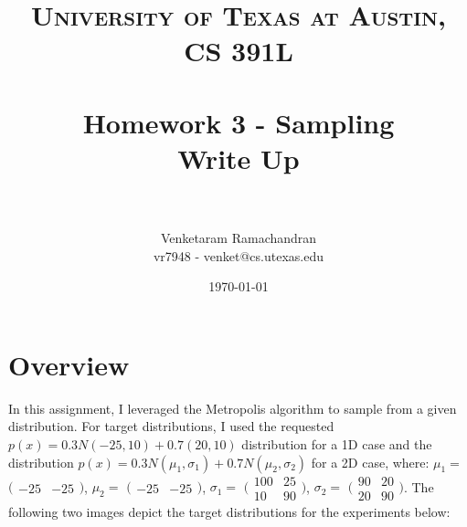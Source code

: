 \documentclass{article} %
\title{	
\normalfont \normalsize 
\textsc{University of Texas at Austin, CS 391L} \\
\horrule{0.6pt} \\[0.4cm] %
\huge Homework 3 - Sampling \\[0.4cm]
\large Write Up  \\
\horrule{2pt} \\[0.5cm] %
}
\author{Venketaram Ramachandran\\
vr7948 - venket@cs.utexas.edu} %
\date{\normalsize\today} %
\begin{document}
\maketitle %

\section{Overview}

In this assignment, I leveraged the Metropolis algorithm to sample from a given distribution. For target distributions, I used the requested \(p(x)=0.3N(-25,10) + 0.7(20,10)\) distribution for a 1D case and the distribution \(p(x)=0.3N(\mu_1,\sigma_1)+0.7N(\mu_2,\sigma_2)\) for a 2D case, where: 
\(\mu_1=\) $\bigl(\begin{smallmatrix}
-25&-25
\end{smallmatrix} \bigr)$, 
\(\mu_2=\) $\bigl(\begin{smallmatrix}
-25&-25
\end{smallmatrix} \bigr)$, 
\(\sigma_1=\) $\bigl(\begin{smallmatrix}
100&25\\10&90
\end{smallmatrix} \bigr)$, 
\(\sigma_2=\) $\bigl(\begin{smallmatrix}
90&20\\20&90
\end{smallmatrix} \bigr)$.
The following two images depict the target distributions for the experiments below:
\end{document}
